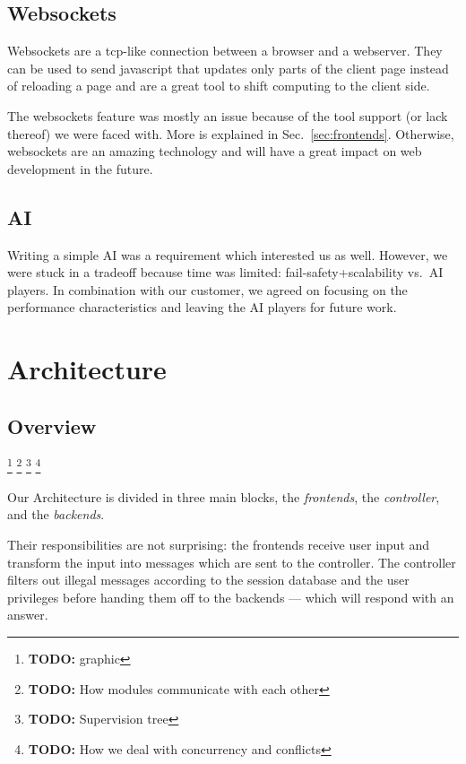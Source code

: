 \documentclass[11pt,a4paper]{report}
\newcommand{\todo}[1]{\footnote{{\color{red} {\bf TODO:} #1}}}
\begin{document}
\subsection{Websockets}
Websockets are a tcp-like connection between a browser and a webserver.
They can be used to send javascript that updates only parts of the client page
instead of reloading a page and are a great tool to shift computing to the 
client side.

The websockets feature was mostly an issue because of the tool support (or lack
thereof) we were faced with. More is explained in Sec.~\ref{sec:frontends}.
Otherwise, websockets are an amazing technology and will have a great impact on
web development in the future.

\subsection{AI}
Writing a simple AI was a requirement which interested us as well. However, we
were stuck in a tradeoff because time was limited: fail-safety+scalability
vs.\ AI players. In combination with our customer, we agreed on focusing on the
performance characteristics and leaving the AI players for future work.

\section{Architecture}
\subsection{Overview}
\todo{graphic}
\todo{How modules communicate with each other}
\todo{Supervision tree}
\todo{How we deal with concurrency and conflicts}

Our Architecture is divided in three main blocks, the {\em frontends}, the 
{\em controller}, and the {\em backends}.

Their responsibilities are not surprising: the frontends receive user input and
transform the input into messages which are sent to the controller.
The controller filters out illegal messages according to the session database
and the user privileges before handing them off to the backends --- which will
respond with an answer.
\end{document}

